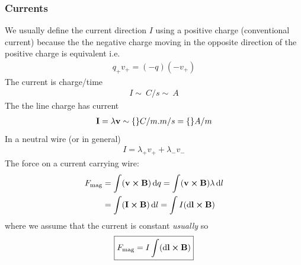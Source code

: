 \documentclass[../main.tex]{subfiles}
\begin{document}
\subsubsection*{Currents}
We usually define the current direction $I$ using a positive charge (conventional current) because the the negative charge moving in the opposite direction of the positive charge is equivalent i.e.
\begin{align*}
    q_+ v_+ = (-q)(-v_+)
\end{align*}
The current is charge/time
\begin{align*}
    I \sim \qty{}{C/s} \sim \qty{}{A}
\end{align*}
The the line charge has current
\begin{align*}
    \vb I = \lambda \vb v \sim \qty{}{C/m.m/s} = \qty{}{A/m}
\end{align*}
In a neutral wire (or in general)
\begin{align*}
    I = \lambda_+ v_+ + \lambda_- v_-
\end{align*}
The force on a current carrying wire:
\begin{align*}
    F_\text{mag} &= \int (\vb v \cross \vb B) \dd{q} = \int (\vb v \cross \vb B) \lambda \dd{l} \\
    &= \int (\vb I \cross \vb B) \dd{l} = \int I(\dd{\vb l} \cross \vb B)
\end{align*}
where we assume that the current is constant \textit{usually} so
\begin{align*}
    \boxed{
        F_\text{mag} = I \int (\dd{\vb l} \cross \vb B)
    }
\end{align*}
\end{document}
